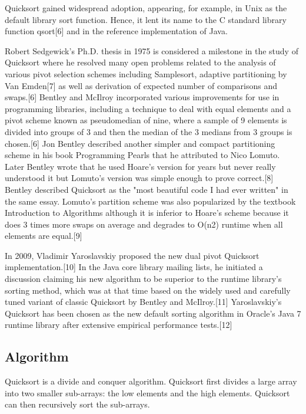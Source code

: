 \documentclass[10pt,a4paper]{article}
\begin{document}
Quicksort gained widespread adoption, appearing, for example, in Unix as the default library sort function. Hence, it lent its name to the C standard library function qsort[6] and in the reference implementation of Java.

Robert Sedgewick's Ph.D. thesis in 1975 is considered a milestone in the study of Quicksort where he resolved many open problems related to the analysis of various pivot selection schemes including Samplesort, adaptive partitioning by Van Emden[7] as well as derivation of expected number of comparisons and swaps.[6] Bentley and McIlroy incorporated various improvements for use in programming libraries, including a technique to deal with equal elements and a pivot scheme known as pseudomedian of nine, where a sample of 9 elements is divided into groups of 3 and then the median of the 3 medians from 3 groups is chosen.[6] Jon Bentley described another simpler and compact partitioning scheme in his book Programming Pearls that he attributed to Nico Lomuto. Later Bentley wrote that he used Hoare's version for years but never really understood it but Lomuto's version was simple enough to prove correct.[8] Bentley described Quicksort as the "most beautiful code I had ever written" in the same essay. Lomuto's partition scheme was also popularized by the textbook Introduction to Algorithms although it is inferior to Hoare's scheme because it does 3 times more swaps on average and degrades to O(n2) runtime when all elements are equal.[9]

In 2009, Vladimir Yaroslavskiy proposed the new dual pivot Quicksort implementation.[10] In the Java core library mailing lists, he initiated a discussion claiming his new algorithm to be superior to the runtime library's sorting method, which was at that time based on the widely used and carefully tuned variant of classic Quicksort by Bentley and McIlroy.[11] Yaroslavskiy's Quicksort has been chosen as the new default sorting algorithm in Oracle's Java 7 runtime library after extensive empirical performance tests.[12]

\subsection{Algorithm}
Quicksort is a divide and conquer algorithm. Quicksort first divides a large array into two smaller sub-arrays: the low elements and the high elements. Quicksort can then recursively sort the sub-arrays.
\end{document}
